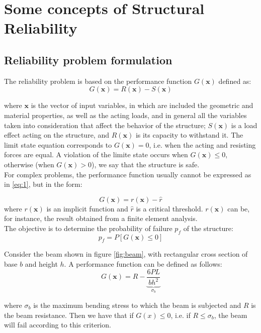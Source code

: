 \chapter{Some concepts of Structural Reliability}
\label{ch:2}
\section{Reliability problem formulation}
The reliability problem is based on the performance function $G(\bm{x})$ defined as:
\begin{equation} \label{eq:1}
    G(\bm{x})=R(\bm{x}) - S(\bm{x})
\end{equation}

where $\bm{x}$ is the vector of input variables, in which are included the geometric and material properties, as well as the acting loads, and in general all the variables taken into consideration that affect the behavior of the structure; $S(\bm{x})$ is a load effect acting on the structure, and $R(\bm{x})$ is its capacity to withstand it. The limit state equation corresponds to $G(\bm{x})=0$, i.e. when the acting and resisting forces are equal. A violation of the limite state occurs when $G(\bm{x}) \leq 0$, otherwise (when $G(\bm{x}) > 0$), we say that the structure is safe. \\

For complex problems, the performance function usually cannot be expressed as in \ref{eq:1}, but in the form:

\begin{equation}
    G(\bm{x}) = r(\bm{x}) - \hat{r}
\end{equation}
where $r(\bm{x})$ is an implicit function and $\hat{r}$ is a critical threshold. $r(\bm{x})$ can be, for instance, the result obtained from a finite element analysis. \\

The objective is to determine the probability of failure $p_f$ of the structure:
\begin{equation} \label{eq:pf}
p_f = P[G(\bm{x}) \leq 0]    
\end{equation}

\begin{testexample}
Consider the beam shown in figure \ref{fig:beam}, with rectangular cross section of base $b$ and height $h$. A performance function can be defined as follows:
\begin{equation} \label{eq:example}
    G(\bm{x})=R - \underbrace{\frac{6PL}{bh^2}}_{\sigma_b}
\end{equation}


where $\sigma_b$ is the maximum bending stress to which the beam is subjected and $R$ is the beam resistance. Then we have that if $G(x) \leq 0$, i.e. if $R \leq \sigma_b$, the beam will fail according to this criterion.
\end{testexample}


